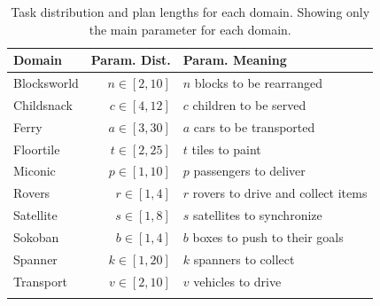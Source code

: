 \begin{table}[t!]
\centering
\begin{tabular}{lrl}
\toprule
\textbf{Domain} & \textbf{Param. Dist.} & \textbf{Param. Meaning}               \\ \midrule
Blocksworld     & $n \in [2,10]$        & $n$ blocks to be rearranged           \\
Childsnack      & $c \in [4,12]$        & $c$ children to be served             \\
Ferry           & $a \in [3,30]$        & $a$ cars to be transported            \\
Floortile       & $t \in [2,25]$        & $t$ tiles to paint                    \\
Miconic         & $p \in [1, 10]$       & $p$ passengers to deliver             \\
Rovers          & $r \in [1,4]$         & $r$ rovers to drive and collect items \\
Satellite       & $s \in [1,8]$         & $s$ satellites to synchronize         \\
Sokoban         & $b \in [1,4]$         & $b$ boxes to push to their goals      \\
Spanner         & $k \in [1,20]$        & $k$ spanners to collect               \\
Transport       & $v \in [2,10]$        & $v$ vehicles to drive                 \\
\bottomrule \\
\end{tabular}
\caption{Task distribution and plan lengths for each domain. Showing only the
  main parameter for each domain.}
\label{tab:domain-params-small-exp}
\end{table}
